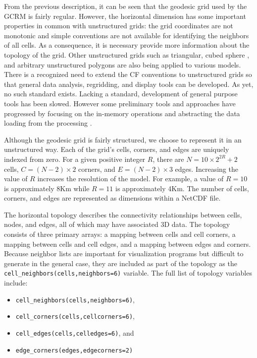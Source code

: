 From the previous description, it can be seen that the geodesic grid used by
the GCRM is fairly regular. However, the horizontal dimension has some
important properties in common with unstructured grids: the grid coordinates
are not monotonic and simple conventions are not available for identifying the
neighbors of all cells.  As a consequence, it is necessary provide more
information about the topology of the grid. Other unstructured grids such as
triangular, cubed sphere \cite{CUBE}, and arbitrary unstructured polygons are
also being applied to various models.  There is a recognized need to extend
the CF conventions to unstructured grids so that general data analysis,
regridding, and display tools can be developed. As yet, no such standard
exists.  Lacking a standard, development of general purpose tools has been
slowed.  However some preliminary tools and approaches have progressed by
focusing on the in-memory operations and abstracting the data loading from the
processing \cite{UGRID}. 

Although the geodesic grid is fairly structured, we choose to represent it in
an unstructured way.  Each of the grid's cells, corners, and edges are
uniquely indexed from zero.  For a given positive integer $R$, there are $N =
10 \times 2^{2R} + 2$ cells, $C = (N-2) \times 2$ corners, and $E = (N-2)
\times 3$ edges.  Increasing the value of $R$ increases the resolution of the
model.  For example, a value of $R=10$ is approximately 8Km while $R=11$ is
approximately 4Km.  The number of cells, corners, and edges are represented as
dimensions within a NetCDF file.

The horizontal topology describes the connectivity relationships between
cells, nodes, and edges, all of which may have associated 3D data.  The
topology consists of three primary arrays: a mapping between cells and cell
corners, a mapping between cells and cell edges, and a mapping between edges
and corners.  Because neighbor lists are important for visualization programs
but difficult to generate in the general case, they are included as part of
the topology as the \verb+cell_neighbors(cells,neighbors=6)+ variable.  The
full list of topology variables include:

\begin{itemize}
\item \verb+cell_neighbors(cells,neighbors=6)+,
\item \verb+cell_corners(cells,cellcorners=6)+,
\item \verb+cell_edges(cells,celledges=6)+, and
\item \verb+edge_corners(edges,edgecorners=2)+
\end{itemize}

